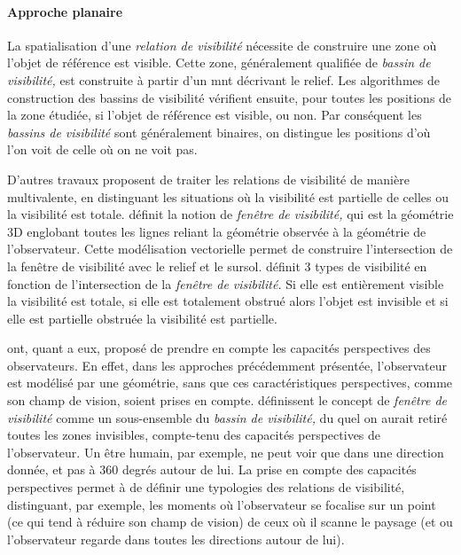 
\paragraph{Approche planaire}


La spatialisation d'une \emph{relation de visibilité} nécessite de
construire une zone où l'objet de référence est visible. Cette zone,
généralement qualifiée de \emph{bassin de visibilité,} est construite
à partir d'un \ac{mnt} décrivant le relief. Les algorithmes de
construction des bassins de visibilité vérifient ensuite, pour toutes
les positions de la zone étudiée, si l'objet de référence est visible,
ou non. Par conséquent les \emph{bassins de visibilité} sont
généralement binaires, on distingue les positions d'où l'on voit de
celle où on ne voit pas.

D'autres travaux proposent de traiter les relations de visibilité de
manière multivalente, \ie en distinguant les situations où la
visibilité est partielle de celles ou la visibilité est
totale. \textcite{Ramos2003} définit la notion de \emph{fenêtre de
  visibilité,} qui est la géométrie 3D englobant toutes les lignes
reliant la géométrie observée à la géométrie de l'observateur. Cette
modélisation vectorielle permet de construire l'intersection de la
fenêtre de visibilité avec le relief et le sursol. \textcite{Ramos203}
définit 3 types de visibilité en fonction de l'intersection de la
\emph{fenêtre de visibilité.} Si elle est entièrement visible la
visibilité est totale, si elle est totalement obstrué alors l'objet
est invisible et si elle est partielle obstruée la visibilité est
partielle.

\textcite{Lonergan2016} ont, quant a eux, proposé de prendre en compte
les capacités perspectives des observateurs. En effet, dans les
approches précédemment présentée, l'observateur est modélisé par une
géométrie, sans que ces caractéristiques perspectives, comme son champ
de vision, soient prises en compte. \textcite{Lonergan2016}
définissent le concept de \emph{fenêtre de visibilité} comme un
sous-ensemble du \emph{bassin de visibilité,} du quel on aurait retiré
toutes les zones invisibles, compte-tenu des capacités perspectives de
l'observateur. Un être humain, par exemple, ne peut voir que dans une
direction donnée, et pas à 360 degrés autour de lui. La prise en
compte des capacités perspectives permet à \textcite{Lonergan2016} de
définir une typologies des relations de visibilité, distinguant, par
exemple, les moments où l'observateur se focalise sur un point (ce qui
tend à réduire son champ de vision) de ceux où il scanne le paysage
(et ou l'observateur regarde dans toutes les directions autour de
lui).

